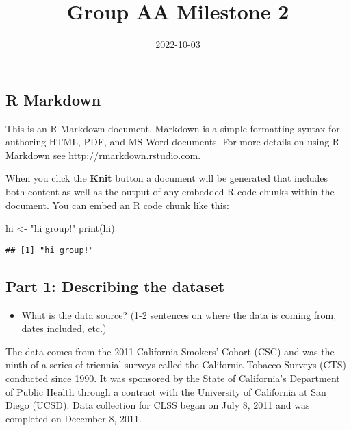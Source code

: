 \documentclass[
]{article}
\title{Group AA Milestone 2}
\author{}
\date{\vspace{-2.5em}2022-10-03}
\newenvironment{Shaded}{\begin{snugshade}}{\end{snugshade}}
\newcommand{\FunctionTok}[1]{\textcolor[rgb]{0.00,0.00,0.00}{#1}}
\newcommand{\NormalTok}[1]{#1}
\newcommand{\OtherTok}[1]{\textcolor[rgb]{0.56,0.35,0.01}{#1}}
\newcommand{\StringTok}[1]{\textcolor[rgb]{0.31,0.60,0.02}{#1}}
\providecommand{\tightlist}{%
  \setlength{\itemsep}{0pt}\setlength{\parskip}{0pt}}
\begin{document}
\maketitle

\hypertarget{r-markdown}{%
\subsection{R Markdown}\label{r-markdown}}

This is an R Markdown document. Markdown is a simple formatting syntax
for authoring HTML, PDF, and MS Word documents. For more details on
using R Markdown see \url{http://rmarkdown.rstudio.com}.

When you click the \textbf{Knit} button a document will be generated
that includes both content as well as the output of any embedded R code
chunks within the document. You can embed an R code chunk like this:

\begin{Shaded}
\begin{Highlighting}[]
\NormalTok{hi }\OtherTok{\textless{}{-}} \StringTok{"hi group!"}
\FunctionTok{print}\NormalTok{(hi)}
\end{Highlighting}
\end{Shaded}

\begin{verbatim}
## [1] "hi group!"
\end{verbatim}

\newpage

\hypertarget{part-1-describing-the-dataset}{%
\subsection{\texorpdfstring{Part 1: Describing the dataset
\n}{Part 1: Describing the dataset }}\label{part-1-describing-the-dataset}}

\begin{itemize}
\tightlist
\item
  What is the data source? (1-2 sentences on where the data is coming
  from, dates included, etc.) \n
\end{itemize}

The data comes from the 2011 California Smokers' Cohort (CSC) and was
the ninth of a series of triennial surveys called the California Tobacco
Surveys (CTS) conducted since 1990. It was sponsored by the State of
California's Department of Public Health through a contract with the
University of California at San Diego (UCSD). Data collection for CLSS
began on July 8, 2011 and was completed on December 8, 2011.
\end{document}
